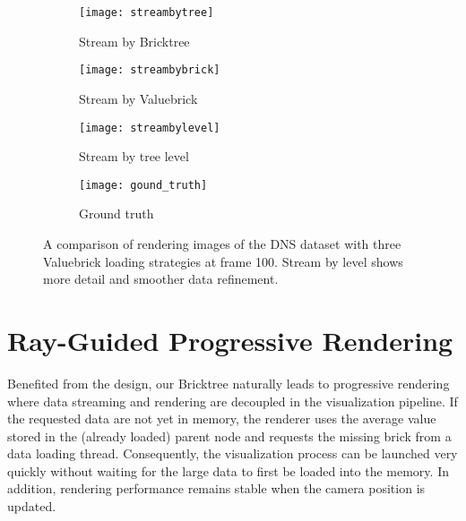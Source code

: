 \begin{figure*}[t]
    \centering
    \begin{subfigure}[b]{0.85\columnwidth}
        \texttt{[image: streambytree]}
        \vspace{-2em}
        \caption{Stream by Bricktree}
        \label{fig:streambytree}
    \end{subfigure}
    \begin{subfigure}[b]{0.85\columnwidth}
        \texttt{[image: streambybrick]}
        \vspace{-2em}
        \caption{Stream by Valuebrick}
        \label{fig:streambybrick}
    \end{subfigure}
    \begin{subfigure}[b]{0.85\columnwidth}
        \texttt{[image: streambylevel]}
        \vspace{-2em}
        \caption{Stream by tree level}
        \label{fig:streambylevel}
    \end{subfigure}
    \begin{subfigure}[b]{0.85\columnwidth}
        \texttt{[image: gound\_truth]}
        \vspace{-2em}
        \caption{Ground truth}
        \label{fig:streambylevel}
    \end{subfigure}
	\caption{\label{fig:streamstrategy}%
	A comparison of rendering images of the DNS dataset with three Valuebrick loading strategies at frame 100. Stream by level shows more detail and smoother data refinement.}
	\vspace{-0.5em}
\end{figure*}


\section{Ray-Guided Progressive Rendering}
Benefited from the design, our Bricktree naturally leads to progressive rendering
where data streaming and rendering are decoupled in
the visualization pipeline. If the requested data are not yet in memory, the renderer uses 
the average value stored in the (already loaded) parent node
and requests the missing brick from a data loading thread. Consequently,
the visualization process can be launched very quickly without waiting for the large
data to first be loaded into the memory. In addition, rendering performance remains stable 
when the camera position is updated. 


